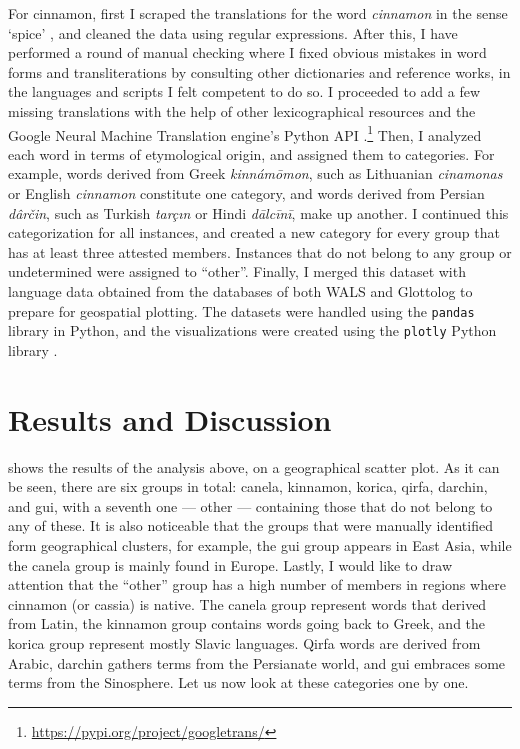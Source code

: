 For cinnamon, first I scraped the translations for the word \textit{cinnamon} in the sense `spice' \autocite{wiktionary_cinnamon_nodate}, and cleaned the data using regular expressions. After this, I have performed a round of manual checking where I fixed obvious mistakes in word forms and transliterations by consulting other dictionaries and reference works, in the languages and scripts I felt competent to do so. I proceeded to add a few missing translations with the help of other lexicographical resources and the Google Neural Machine Translation engine's Python API \autocite{wu_googles_2016}.\footnote{\url{https://pypi.org/project/googletrans/}} Then, I analyzed each word in terms of etymological origin, and assigned them to categories. For example, words derived from Greek \textit{kinnámōmon}, such as Lithuanian \textit{cinamonas} or English \textit{cinnamon} constitute one category, and words derived from Persian \textit{dârčin}, such as Turkish \textit{tarçın} or Hindi \textit{dālcīnī}, make up another. I continued this categorization for all instances, and created a new category for every group that has at least three attested members. Instances that do not belong to any group or undetermined were assigned to ``other''. Finally, I merged this dataset with language data obtained from the databases of both \gls{WALS} \autocite{dryer_wals_2013} and Glottolog \autocite{hammarstrom_glottolog_2022} to prepare for geospatial plotting. The datasets were handled using the \texttt{pandas} library in Python, and the visualizations were created using the \texttt{plotly} Python library \autocites{pandas, plotly}.

\section{Results and Discussion}

 shows the results of the analysis above, on a geographical scatter plot. As it can be seen, there are six groups in total: canela, kinnamon, korica, qirfa, darchin, and gui, with a seventh one --- other --- containing those that do not belong to any of these. It is also noticeable that the groups that were manually identified form geographical clusters, for example, the gui group appears in East Asia, while the canela group is mainly found in Europe. Lastly, I would like to draw attention that the ``other'' group has a high number of members in regions where cinnamon (or cassia) is native. The canela group represent words that derived from Latin, the kinnamon group contains words going back to Greek, and the korica group represent mostly Slavic languages. Qirfa words are derived from Arabic, darchin gathers terms from the Persianate world, and gui embraces some terms from the Sinosphere. Let us now look at these categories one by one.

